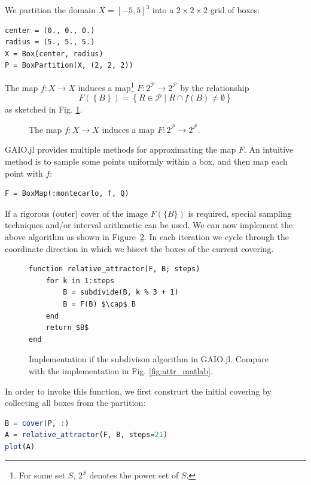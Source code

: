 \documentclass{juliacon}
\newcommand{\cP}{\mathcal{P}}
\begin{document}
We partition the domain $X = \left[ -5, 5 \right]^3$ into a $2 \times 2 \times 2$ grid of boxes: 
\begin{lstlisting}[label=lst:box,backgroundcolor=\color{white}]
center = (0., 0., 0.)
radius = (5., 5., 5.)
X = Box(center, radius)
P = BoxPartition(X, (2, 2, 2))
\end{lstlisting}

The map $f:X\to X$ induces a map\footnote{For some set $S$, $2^S$ denotes the power set of $S$.} $F : 2^\cP \to 2^\cP$ by the relationship 
\begin{equation}
    F \left( \left\{ B \right\} \right) = 
    \left\{ R \in \cP \mid R \cap f(B) \neq \emptyset \right\}
\end{equation}
%
as sketched in Fig. \ref{fig:boxcover}. 
%
\begin{figure}[h]
    \centering
    
    \caption{The map $f:X\to X$ induces a map $F : 2^\cP \to 2^\cP$.}
    \label{fig:boxcover}
\end{figure}
%
GAIO.jl provides multiple methods for approximating the map $F$. An intuitive method is to sample some points  uniformly within a box, and then map each point with $f$:  
\begin{lstlisting}[backgroundcolor=\color{white}]
F = BoxMap(:montecarlo, f, Q)
\end{lstlisting}
If a rigorous (outer) cover of the image $F(\{B\})$ is required, special sampling techniques \cite{rigoroussampling} and/or interval arithmetic can be used.
We can now implement the above algorithm as shown in Figure~\ref{fig:attr_julia}.  In each iteration we cycle through the coordinate direction in which we bisect the boxes of the current covering.
\begin{figure}[h]
\begin{lstlisting}[label=lst:relative_attractor,mathescape,frame=single]
function relative_attractor(F, B; steps)
    for k in 1:steps
        B = subdivide(B, k % 3 + 1)
        B = F(B) $\cap$ B
    end
    return $B$
end
\end{lstlisting}
\caption{Implementation if the subdivison algorithm in GAIO.jl. Compare with the implementation in Fig. \ref{fig:attr_matlab}.}
\label{fig:attr_julia}
\end{figure}

In order to invoke this function, we first construct the initial covering by collecting all boxes from the partition:
\begin{lstlisting}[language=Julia,mathescape,backgroundcolor=\color{white}]
B = cover(P, :)
A = relative_attractor(F, B, steps=21)
plot(A)
\end{lstlisting}
\end{document}
